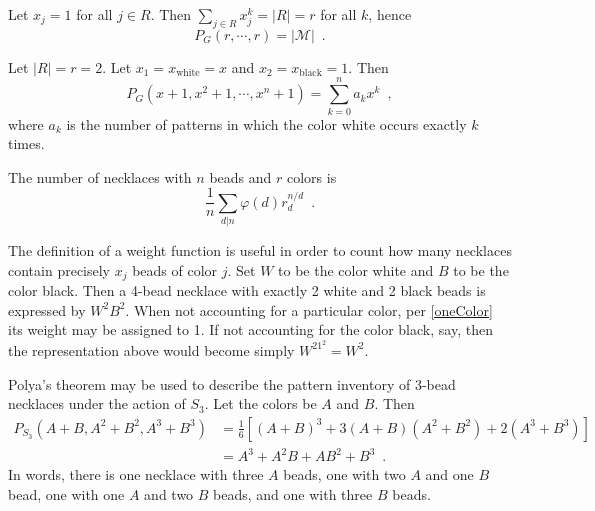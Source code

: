 \begin{corollary}
	\cite[89]{Aigner2007}
	\cite[254]{Tucker1974}
	Let $x_j = 1$ for all $j \in R$. Then $\sum_{j \in R} x_j^k = |R| = r$ for all $k$, hence
	\begin{equation}
		P_G(r, \cdots, r) = |\mathcal{M}| \enspace.
	\end{equation}
\end{corollary}

\begin{corollary}
	\label{oneColor}
	\cite[89]{Aigner2007}
	Let $|R| = r = 2$. Let $x_1 = x_{\text{white}} = x$ and
	$x_2 = x_{\text{black}} = 1$. Then
	\begin{equation}
		P_G(x + 1, x^2 + 1, \cdots, x^n + 1) = \sum_{k = 0}^n a_k x^k \enspace,
	\end{equation}
	where $a_k$ is the number of patterns in which the color white occurs exactly $k$ times.
\end{corollary}

\begin{example}
	\cite[89]{Aigner2007}
	The number of necklaces with $n$ beads and $r$ colors is
	\begin{equation}
		\frac{1}{n} \sum_{d | n} \varphi(d) r_d^{n / d} \enspace.
	\end{equation}
\end{example}

\begin{example}
	\cite[86]{Aigner2007}
	The definition of a weight function is useful in order to count how many necklaces
	contain precisely $x_j$ beads of color $j$. Set $W$ to be the color white and $B$
	to be the color black. Then a 4-bead necklace with exactly 2 white and 2 black beads
	is expressed by $W^2B^2$. When not accounting for a particular color,
	per \ref{oneColor} its weight may be assigned to 1. If not accounting for the color
	black, say, then the representation above would become simply $W^21^2 = W^2$.
\end{example}

\begin{example}
	Polya's theorem may be used to describe the pattern inventory of 3-bead necklaces under
	the action of $S_3$. Let the colors be $A$ and $B$. Then
		\begin{align}
			P_{S_3}(A + B, A^2 + B^2, A^3 + B^3)
			& = \frac{1}{6}[(A + B)^3 + 3 (A + B) (A^2 + B^2) + 2 (A^3 + B^3)] \\
			& = A^3 + A^2 B + A B^2 + B^3 \enspace.
		\end{align}
	In words, there is one necklace with three $A$ beads, one with two $A$ and one $B$ bead,
	one with one $A$ and two $B$ beads, and one with three $B$ beads.
\end{example}

